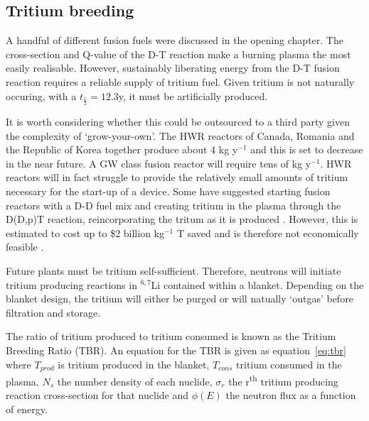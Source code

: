 \FloatBarrier
\subsection{Tritium breeding}
A handful of different fusion fuels were discussed in the opening chapter. The cross-section and Q-value of the D-T reaction make a burning plasma the most easily realisable. However, sustainably liberating energy from the D-T fusion reaction requires a reliable supply of tritium fuel. Given tritium is not naturally occuring, with a $t_{\frac{1}{2}}=12.3$y, it must be artificially produced. 

It is worth considering whether this could be outsourced to a third party given the complexity of `grow-your-own'. The HWR reactors of Canada, Romania and the Republic of Korea together produce about 4 kg y$^{-1}$ and this is set to decrease in the near future. A GW class fusion reactor will require tens of kg y$^{-1}$. HWR reactors will in fact struggle to provide the relatively small amounts of tritium necessary for the start-up of a device. Some have suggested starting fusion reactors with a D-D fuel mix and creating tritium in the plasma through the D(D,p)T reaction, reincorporating the tritum as it is produced \cite{Zheng2016}. However, this is estimated to cost up to \$2 billion kg$^{-1}$ T saved and is therefore not economically feasible \cite{Kovari2018}. 

Future plants must be tritium self-sufficient. Therefore, neutrons will initiate tritium producing reactions in $^{6,7}$Li contained within a blanket. Depending on the blanket design, the tritium will either be purged or will natually `outgas' before filtration and storage. 


The ratio of tritium produced to tritium consumed is known as the Tritium Breeding Ratio (TBR). An equation for the TBR is given as equation~\ref{eq:tbr} where $T_{prod}$ is tritium produced in the blanket, $T_{cons}$ tritium consumed in the plasma, $N_{s}$ the number density of each nuclide, $\sigma_{r}$ the r\textsuperscript{th} tritium producing reaction cross-section for that nuclide and $\phi(E)$ the neutron flux as a function of energy. 

